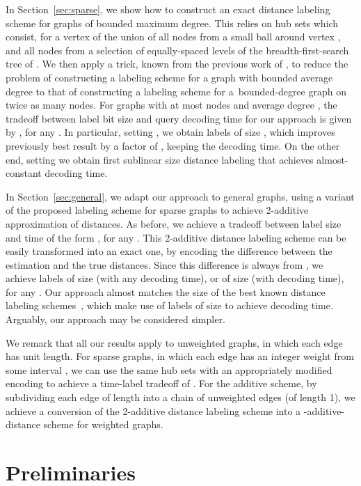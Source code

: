 \documentclass{article}[11pt,letter]
\begin{document}
In Section~\ref{sec:sparse}, we show how to construct an exact distance labeling scheme for graphs of bounded maximum degree. This relies on hub sets which consist, for a vertex  of the union of all nodes from a small ball around vertex , and all nodes from a selection of equally-spaced levels of the breadth-first-search tree of . We then apply a trick, known from the previous work of \cite{Stretch}, to reduce the problem of constructing a labeling scheme for a graph with bounded average degree to that of constructing a labeling scheme for a~bounded-degree graph on twice as many nodes. For graphs with at most  nodes and average degree , the tradeoff between label bit size  and query decoding time  for our approach is given by , for any .
In particular, setting , we obtain labels of size , which improves previously best result \cite{Sublinear} by a factor of , keeping the  decoding time. On the other end, setting  we obtain first sublinear size distance labeling that achieves almost-constant decoding time.

In Section~\ref{sec:general}, we adapt our approach to general graphs, using a variant of the proposed labeling scheme for sparse graphs to achieve 2-additive approximation of distances. As before, we achieve a tradeoff between label size  and time  of the form , for any . This 2-additive distance labeling scheme can be easily transformed into an exact one, by encoding the difference between the estimation and the true distances. Since this difference is always from , we achieve labels of size  (with any  decoding time), or of size  (with  decoding time), for any . Our approach almost matches the size of the best known distance labeling schemes~\cite{DBLP:conf/soda/AlstrupGHP16}, which make use of labels of size  to achieve  decoding time. Arguably, our approach may be considered simpler.

We remark that all our results apply to unweighted graphs, in which each edge has unit length. For sparse graphs, in which each edge has an integer weight from some interval , we can use the same hub sets with an appropriately modified encoding to achieve a time-label tradeoff of . For the additive scheme, by subdividing each edge of length  into a chain of unweighted edges (of length 1), we achieve a conversion of the 2-additive distance labeling scheme into a -additive-distance scheme for weighted graphs.

\section{Preliminaries}\label{sec:preliminaries}
\end{document}
